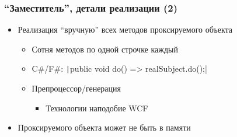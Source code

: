 \documentclass[xetex,mathserif,serif]{beamer}
\begin{document}
	\begin{frame}
		\frametitle{``Заместитель'', детали реализации (2)}
		\begin{itemize}
			\item Реализация ``вручную'' всех методов проксируемого объекта
			\begin{itemize}
				\item Сотня методов по одной строчке каждый
				\item C\#/F\#: \texttt|public void do() => realSubject.do();|
				\item Препроцессор/генерация
				\begin{itemize}
					\item Технологии наподобие WCF
				\end{itemize}
			\end{itemize}
			\item Проксируемого объекта может не быть в памяти
		\end{itemize}
	\end{frame}
\end{document}
